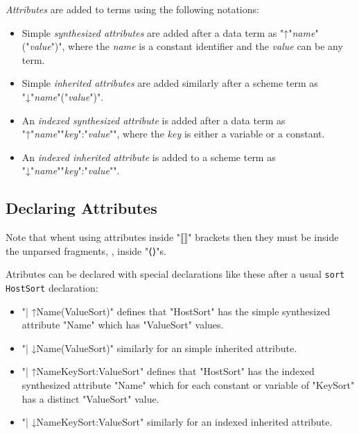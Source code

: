 \documentclass[11pt]{article} %
\begin{document}
\begin{notation}\label{nota:attributes}
  \emph{Attributes} are added to terms using the following notations:
  \begin{itemize}

  \item Simple \emph{synthesized attributes} are added after a data term as
    "↑"\emph{name}"("\emph{value}")", where the \emph{name} is a constant identifier and the
    \emph{value} can be any term.

  \item Simple \emph{inherited attributes} are added similarly after a scheme term as
    "↓"\emph{name}"("\emph{value}")".

  \item An \emph{indexed synthesized attribute} is added after a data term as
    "↑"\emph{name}"{"\emph{key}":"\emph{value}"}", where the \emph{key} is either a variable or a
    constant.

  \item An \emph{indexed inherited attribute} is added to a scheme term as
    "↓"\emph{name}"{"\emph{key}":"\emph{value}"}".

  \end{itemize}
\end{notation}

\subsection{Declaring Attributes}

Note that whent using attributes inside "⟦⟧" brackets then they must be inside the unparsed
fragments, \ie, inside "⟨⟩"s.

\begin{notation}\label{nota:attribute-sorts}
  Atributes can be declared with special declarations like these after a usual \verb"sort HostSort"
  declaration:
  \begin{itemize}

  \item "| ↑Name(ValueSort)" defines that "HostSort" has the simple synthesized
    attribute "Name" which has "ValueSort" values.

  \item "| ↓Name(ValueSort)" similarly for an simple inherited attribute.

  \item "| ↑Name{KeySort:ValueSort}" defines that "HostSort" has the indexed
    synthesized attribute "Name" which for each constant or variable of "KeySort" has a distinct
    "ValueSort" value.

  \item "| ↓Name{KeySort:ValueSort}" similarly for an indexed inherited attribute.

  \end{itemize}
\end{notation}
\end{document}
